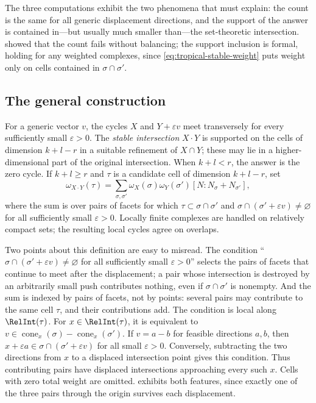 The three computations exhibit the two phenomena that
 must explain: the count is the same
for all generic displacement directions, and the support of the answer is
contained in---but usually much smaller than---the set-theoretic
intersection.   showed that the count fails without balancing;
the support inclusion is formal, holding for any weighted complexes,
since \eqref{eq:tropical-stable-weight} puts weight only on cells
contained in $\sigma\cap\sigma'$.

\subsection{The general construction}
\label{sec:ch10-general-stable}

For a generic vector $v$, the cycles $X$ and $Y+\varepsilon v$ meet
transversely for every sufficiently small $\varepsilon>0$.  The
\emph{stable intersection} $X\cdot Y$ is supported on the
cells of dimension $k+l-r$ in a suitable refinement of $X\cap Y$; these
may lie in a higher-dimensional part of the original intersection.
When $k+l<r$, the answer is the zero cycle. If $k+l\geq r$ and $\tau$ is a
candidate cell of dimension $k+l-r$, set
\begin{equation}
\label{eq:tropical-stable-weight}
 \omega_{X\cdot Y}(\tau)
 =\sum_{\sigma,\sigma'}
   \omega_X(\sigma)\omega_Y(\sigma')
   [N:N_\sigma+N_{\sigma'}],
\end{equation}
where the sum is over pairs of facets for which
$\tau\subset\sigma\cap\sigma'$ and
$\sigma\cap(\sigma'+\varepsilon v)\neq\varnothing$ for all sufficiently
small $\varepsilon>0$.  Locally finite complexes are handled on relatively
compact sets; the resulting local cycles agree on overlaps.

Two points about this definition are easy to misread.  The condition
``$\sigma\cap(\sigma'+\varepsilon v)\neq\varnothing$ for all sufficiently
small $\varepsilon>0$'' selects the pairs of facets that continue to meet
after the displacement; a pair whose intersection is destroyed by an
arbitrarily small push contributes nothing, even if $\sigma\cap\sigma'$ is
nonempty.  And the sum is indexed by pairs of facets, not by points: several
pairs may contribute to the same cell $\tau$, and their contributions add.
The condition is local along $\RelInt(\tau)$. For $x\in\RelInt(\tau)$,
it is equivalent to
$v\in\operatorname{cone}_x(\sigma)-\operatorname{cone}_x(\sigma')$.
If $v=a-b$ for feasible directions $a,b$, then
$x+\varepsilon a\in\sigma\cap(\sigma'+\varepsilon v)$ for all small
$\varepsilon>0$. Conversely, subtracting the two directions from $x$ to a
displaced intersection point gives this condition. Thus contributing pairs
have displaced intersections approaching every such $x$. Cells with zero
total weight are omitted.
 exhibits both features, since exactly
one of the three pairs through the origin survives each
displacement.


